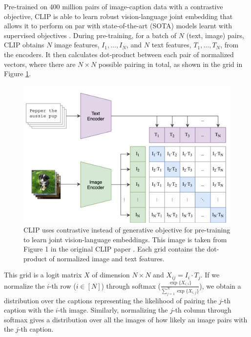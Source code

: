Pre-trained on 400 million pairs of image-caption data with a contrastive objective, CLIP is able to learn robust vision-language joint embedding that allows it to perform on par with state-of-the-art (SOTA) models learnt with supervised objectives \citep{CLIPpaper}.  
During pre-training, for a batch of $N$ (text, image) pairs, CLIP obtains $N$ image features, $I_1,\dots,I_N$, and $N$ text features, $T_1,\dots,T_N$, from the encoders. 
It then calculates dot-product between each pair of normalized vectors, where there are $N \times N$ possible pairing in total, as shown in the grid in Figure \ref{modeling.clip.pretrainingobj}.
\begin{figure}[h!]
\centering
\includegraphics[width=0.7\linewidth]{modeling/CLIP.png}  
\caption{CLIP uses contrastive instead of generative objective for pre-training to learn joint vision-language embeddings. This image is taken from Figure 1 in the original CLIP paper \citep{CLIPpaper}. Each grid contains the dot-product of normalized image and text features.}
\label{modeling.clip.pretrainingobj}
\end{figure}
This grid is a logit matrix $X$ of dimension $N\times N$ and $X_{ij} = I_i \cdot T_j$. 
If we normalize the $i$-th row ($i \in [N]$) through softmax ($\frac{\exp\{ {X}_{i,i} \}}{ \sum_{j=1}^N \exp\{ {X}_{i,j}\}}$), we obtain a distribution over the captions representing the likelihood of pairing the $j$-th caption with the $i$-th image. 
Similarly, normalizing the $j$-th column through softmax gives a distribution over all the images of how likely an image pairs with the $j$-th caption. 

